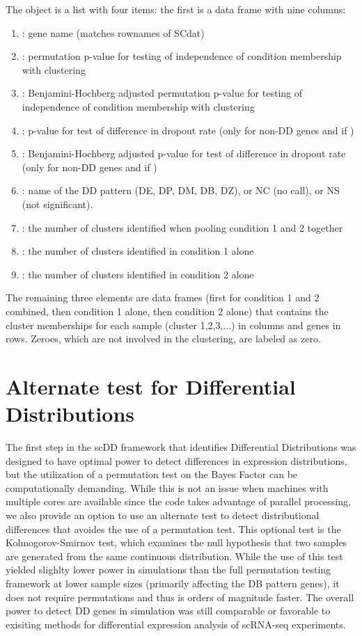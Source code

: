 \documentclass{article}
\begin{document}
The  object is a list with four items: the first is a data frame with nine columns: 
\begin{enumerate}
  \item {}: gene name (matches rownames of SCdat)
  \item {}: permutation p-value for testing of independence of condition membership with clustering
  \item {}: Benjamini-Hochberg adjusted permutation p-value for testing of independence of condition membership with clustering
  \item {}: p-value for test of difference in dropout rate (only for non-DD genes and if )
  \item {}: Benjamini-Hochberg adjusted p-value for test of difference in dropout rate (only for non-DD genes and if )
  \item {}: name of the DD pattern (DE, DP, DM, DB, DZ), or NC (no call), or NS (not significant).  
  \item {}: the number of clusters identified when pooling condition 1 and 2 together
  \item {}: the number of clusters identified in condition 1 alone
  \item {}: the number of clusters identified in condition 2 alone
\end{enumerate}
  The remaining three elements are data frames (first for condition 1 and 2 combined, then condition 1 alone, then condition 2 alone) that contains the cluster memberships for each sample (cluster 1,2,3,...) in columns and genes in rows.  Zeroes, which are not involved in the clustering, are labeled as zero.  
  

\section{Alternate test for Differential Distributions}

The first step in the scDD framework that identifies Differential Distributions was designed to have optimal power to detect differences in expression distributions, but the utilization of a permutation test on the Bayes Factor can be computationally demanding.  While this is not an issue when machines with multiple cores are available since the code takes advantage of parallel processing, we also provide an option to use an alternate test to detect distributional differences that avoides the use of a permutation test.  This optional test is the Kolmogorov-Smirnov test, which examines the null hypothesis that two samples are generated from the same continuous distribution.  While the use of this test yielded slighlty lower power in simulations than the full permutation testing framework at lower sample sizes (primarily affecting the DB pattern genes), it does not require permutations and thus is orders of magnitude faster.  The overall power to detect DD genes in simulation was still comparable or favorable to exisiting methods for differential expression analysis of scRNA-seq experiments.  
\end{document}
